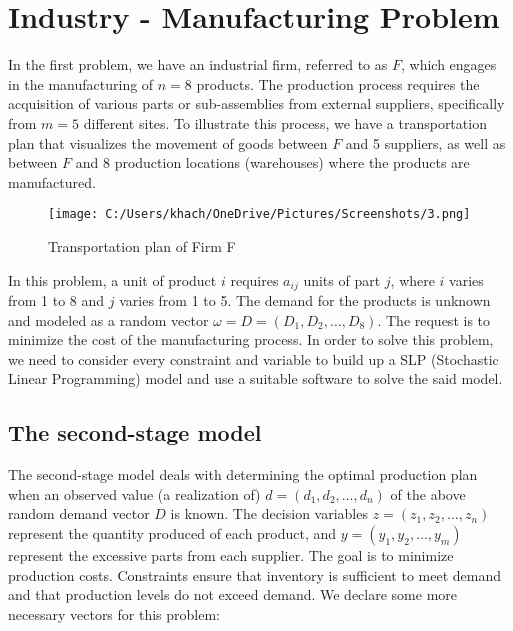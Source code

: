 \documentclass[a4paper]{article}
\begin{document}
	\section{Industry - Manufacturing Problem }\label{bai_tap}
	\hspace{1.6em}In the first problem, we have an industrial firm, referred to as \( F \), which engages in the manufacturing of \( n = 8 \) products. The production process requires the acquisition of various parts or sub-assemblies from external suppliers, specifically from \( m = 5 \) different sites. To illustrate this process, we have a transportation plan that visualizes the movement of goods between \( F \) and 5 suppliers, as well as between \( F \) and \( 8 \) production locations (warehouses) where the products are manufactured.
	\begin{figure}[htbp]
		\centering
		\texttt{[image: C:/Users/khach/OneDrive/Pictures/Screenshots/3.png]}
		\caption{Transportation plan of Firm F}
		\label{fig:Transportation plan of Firm F}
	\end{figure}
	\hspace{1.6em}In this problem, a unit of product \( i \) requires \( a_{ij} \) units of part \( j \), where \( i \) varies from 1 to 8 and \( j \) varies from 1 to 5. The demand for the products is unknown and modeled as a random vector \( \omega = D = (D_1, D_2, \ldots, D_8) \). The request is to minimize the cost of the manufacturing process. In order to solve this problem, we need to consider every constraint and variable to build up a SLP (Stochastic Linear Programming) model and use a suitable software to solve the said model.
	
	\subsection{The second-stage model}
	\hspace{1.6em}The second-stage model deals with determining the optimal production plan when an observed value (a realization of) $d = (d_1, d_2, \ldots, d_n)$ of the above random demand vector $D$ is known. The decision variables $z = (z_1, z_2, \ldots, z_n)$ represent the quantity produced of each product, and $y = (y_1, y_2, \ldots, y_m)$ represent the excessive parts from each supplier. The goal is to minimize production costs. Constraints ensure that inventory is sufficient to meet demand and that production levels do not exceed demand. We declare some more necessary vectors for this problem:
	
\end{document}
